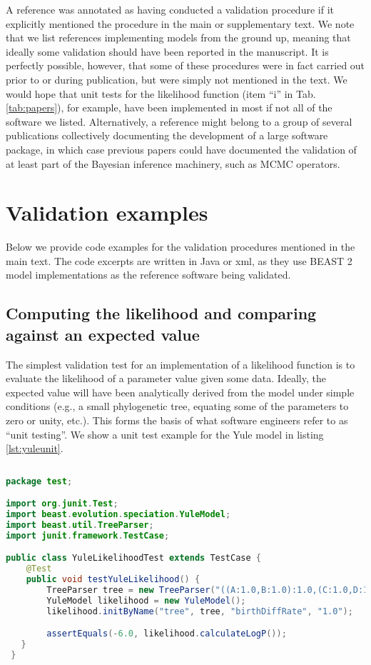 \documentclass[oneside]{article}
\begin{document}
A reference was annotated as having conducted a validation
procedure if it explicitly mentioned the procedure in the main or
supplementary text.
We note that we list references implementing models from the ground
up, meaning that ideally some validation should have been
reported in the manuscript.
It is perfectly possible, however, that some of these procedures were in fact
carried out prior to or during publication, but were simply not
mentioned in the text.
We would hope that unit tests for the likelihood function (item ``i''
in Tab. \ref{tab:papers}), for example, have been implemented in most
if not all of the software we listed.
Alternatively, a reference might belong to a group of several
publications collectively documenting the development of a large
software package, in which case previous papers could have documented 
the validation of at least part of the Bayesian inference machinery,
such as MCMC operators.

\section*{Validation examples}
Below we provide code examples for the validation procedures mentioned
in the main text.
The code excerpts are written in Java or xml, as they use BEAST 2
model implementations as the reference software being validated.

\subsection*{Computing the likelihood and comparing against an expected value}

The simplest validation test for an implementation of a likelihood
function is to evaluate the likelihood of a parameter value given some
data.
Ideally, the expected value will have been analytically derived from the
model under simple conditions (e.g., a small phylogenetic tree,
equating some of the parameters to zero or unity, etc.).
This forms the basis of what software engineers refer to as ``unit testing''.
We show a unit test example for the Yule model in listing \ref{lst:yuleunit}.

\singlespacing
{\small
\begin{lstlisting}[language=Java, caption=Unit test for Yule model
  likelihood function given small phylogenetic tree.,label={lst:yuleunit}]
  
package test;

import org.junit.Test;
import beast.evolution.speciation.YuleModel;
import beast.util.TreeParser;
import junit.framework.TestCase;

public class YuleLikelihoodTest extends TestCase {
    @Test
    public void testYuleLikelihood() {
        TreeParser tree = new TreeParser("((A:1.0,B:1.0):1.0,(C:1.0,D:1.0):1.0);");
        YuleModel likelihood = new YuleModel();
        likelihood.initByName("tree", tree, "birthDiffRate", "1.0");

        assertEquals(-6.0, likelihood.calculateLogP());
   }
 }
\end{lstlisting}
}
\end{document}

